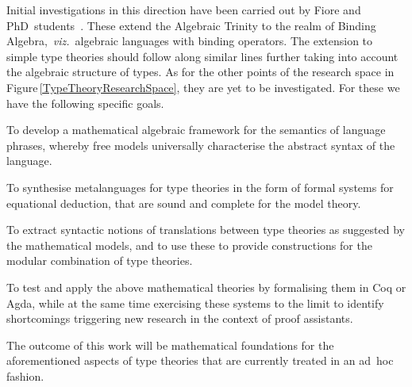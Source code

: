 \documentclass[11pt,twocolumn]{article}
\newcounter{CC}
\newenvironment{resenumerate}
  {\begin{list}{[\textbf{\arabic{CC}]}}
  {\usecounter{CC}
   \setlength{\topsep}{2pt}
   \setlength{\partopsep}{2pt}
   \setlength{\itemsep}{2.5pt}
   \setlength{\parsep}{2.5pt}
   \setlength{\leftmargin}{1.65em}
   \setlength{\labelwidth}{1.15em}
 }}
  {\end{list}}
\newcommand{\hide}[1]{}
\newcommand{\viz}{\emph{viz.}}
\begin{document}
Initial investigations in this direction have been carried out by Fiore
and PhD~students~\cite{FioreHur,FioreMahmoud}.  These extend the Algebraic
Trinity to the realm of Binding Algebra,~\viz~algebraic languages with binding
operators.  The extension to simple type theories should follow along
similar lines further taking into account the algebraic structure of
types.  As for the other points of the research space in
Figure\,\ref{TypeTheoryResearchSpace}, they are yet to be investigated.  For
these we have the following specific goals.
\begin{resenumerate}\setcounter{CC}{0}
\item
  To develop a mathematical algebraic framework for the semantics of
  language phrases, whereby free models universally characterise the
  abstract syntax of the language.

\item
  To synthesise metalanguages for type theories in the form of formal
  systems for equational deduction, that are sound and complete for the
  model theory.

\item
  To extract syntactic notions of translations between type theories as
  suggested by the mathematical models, and to use these to provide
  constructions for the modular combination of type theories.

\item
  To test and apply the above mathematical theories by formalising them in
  Coq or Agda, while at the same time exercising these systems to the
  limit to identify shortcomings triggering new research in the context of
  proof assistants.
\end{resenumerate}
The outcome of this work will be mathematical foundations for the
aforementioned aspects of type theories that are currently treated in an
ad~hoc fashion.  
\hide{
Furthermore, it will provide a principled approach by which
to reconsider the problem of integrating polymorphism and dependent types. 
}

\hide{ polynomial functors (from discrete to groupoidal) --- the meaning of
  typing rules}
\end{document}
